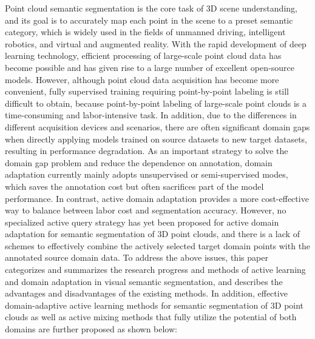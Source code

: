Point cloud semantic segmentation is the core task of 3D scene understanding, and its goal is to accurately map each point in the scene to a preset semantic category, which is widely used in the fields of unmanned driving, intelligent robotics, and virtual and augmented reality. With the rapid development of deep learning technology, efficient processing of large-scale point cloud data has become possible and has given rise to a large number of excellent open-source models. However, although point cloud data acquisition has become more convenient, fully supervised training requiring point-by-point labeling is still difficult to obtain, because point-by-point labeling of large-scale point clouds is a time-consuming and labor-intensive task. In addition, due to the differences in different acquisition devices and scenarios, there are often significant domain gaps when directly applying models trained on source datasets to new target datasets, resulting in performance degradation. As an important strategy to solve the domain gap problem and reduce the dependence on annotation, domain adaptation currently mainly adopts unsupervised or semi-supervised modes, which saves the annotation cost but often sacrifices part of the model performance. In contrast, active domain adaptation provides a more cost-effective way to balance between labor cost and segmentation accuracy. However, no specialized active query strategy has yet been proposed for active domain adaptation for semantic segmentation of 3D point clouds, and there is a lack of schemes to effectively combine the actively selected target domain points with the annotated source domain data. To address the above issues, this paper categorizes and summarizes the research progress and methods of active learning and domain adaptation in visual semantic segmentation, and describes the advantages and disadvantages of the existing methods. In addition, effective domain-adaptive active learning methods for semantic segmentation of 3D point clouds as well as active mixing methods that fully utilize the potential of both domains are further proposed as shown below:

